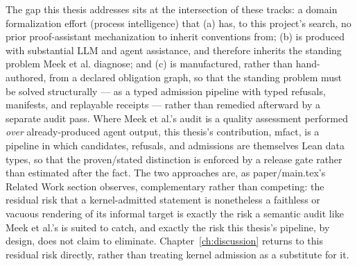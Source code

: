 The gap this thesis addresses sits at the intersection of these tracks:
a domain formalization effort (process intelligence) that (a) has, to
this project's search, no prior proof-assistant mechanization to inherit
conventions from; (b) is produced with substantial LLM and agent
assistance, and therefore inherits the standing problem Meek et al.
diagnose; and (c) is manufactured, rather than hand-authored, from a
declared obligation graph, so that the standing problem must be solved
structurally --- as a typed admission pipeline with typed refusals,
manifests, and replayable receipts --- rather than remedied afterward by
a separate audit pass. Where Meek et al.'s audit is a quality assessment
performed \emph{over} already-produced agent output, this thesis's
contribution, \textsf{mfact}, is a pipeline in which candidates,
refusals, and admissions are themselves Lean data types, so that the
proven/stated distinction is enforced by a release gate rather than
estimated after the fact. The two approaches are, as
paper/main.tex's Related Work section observes, complementary rather
than competing: the residual risk that a kernel-admitted statement is
nonetheless a faithless or vacuous rendering of its informal target is
exactly the risk a semantic audit like Meek et al.'s is suited to catch,
and exactly the risk this thesis's pipeline, by design, does not claim
to eliminate. Chapter~\ref{ch:discussion} returns to this residual risk
directly, rather than treating kernel admission as a substitute for it.
